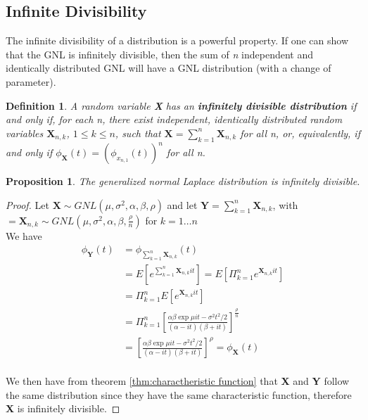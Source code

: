 \documentclass[12pt,travaildirige,nobabel, twoside]{dms}
\numberwithin{equation}{section}
\numberwithin{table}{chapter}
\numberwithin{figure}{chapter}
\newtheorem{mydef}{Definition}[section]
\newtheorem{proposition}{Proposition}[section]
\begin{document}
\subsection{Infinite Divisibility}

The infinite divisibility of a distribution is a powerful property.  If one can show that the GNL is infinitely divisible, then the sum of \textit{n} independent and identically distributed GNL will have a GNL distribution (with a change of parameter).\\

\begin{mydef}
A random variable \textbf{X} has an \textbf{infinitely divisible distribution} if and only if, for each n, there exist independent, identically distributed random variables $\textbf{X}_{n,k}$, $1 \le k \le n$, such that $\textbf{X}= \sum^n_{k=1}\textbf{X}_{n,k}$ for all n, or, equivalently, if and only if $\phi_\textbf{X}(t)=(\phi_{x_{n,1}}(t))^n$ for all n\nocite{distquadGNL}.\\
\end{mydef}

\begin{proposition}
The generalized normal Laplace distribution is infinitely divisible.
\end{proposition}

\begin{proof}
Let \begin{math}\textbf{X}\sim GNL( \mu,\sigma^2,\alpha, \beta,\rho)\end{math} and let \begin{math}\textbf{Y}= \sum^n_{k=1}\textbf{X}_{n,k}\end{math}, with \begin{math}=\textbf{X}_{n,k}\sim GNL( \mu,\sigma^2,\alpha, \beta,\frac{\rho}{n})\end{math} for $k=1\dots n$\\

We have \begin{equation}
\begin{aligned}
\phi_\textbf{Y}(t)&=\phi_{\sum^n_{k=1}\textbf{X}_{n,k}}(t)\\
&=E[e^{\sum^n_{k=1}\textbf{X}_{n,k}it}]=E[\Pi^n_{k=1}e^{\textbf{X}_{n,k}it}]\\
&=\Pi^n_{k=1}E[e^{\textbf{X}_{n,k}it}]\\
&=\Pi^n_{k=1}[\frac{\alpha \beta \exp{\mu it-\sigma ^2 t^2/2}}{(\alpha-it)(\beta+it)}]^{\frac{\rho}{n}}\\
&=[\frac{\alpha \beta \exp{\mu it-\sigma ^2 t^2/2}}{(\alpha-it)(\beta+it)}]^{\rho}=\phi_\textbf{X}(t)\\
\end{aligned}
\end{equation}

We then have from theorem \ref{thm:charactheristic function} that \textbf{X} and \textbf{Y} follow the same distribution since they have the same characteristic function, therefore \textbf{X} is infinitely divisible.
\end{proof}
\end{document}
